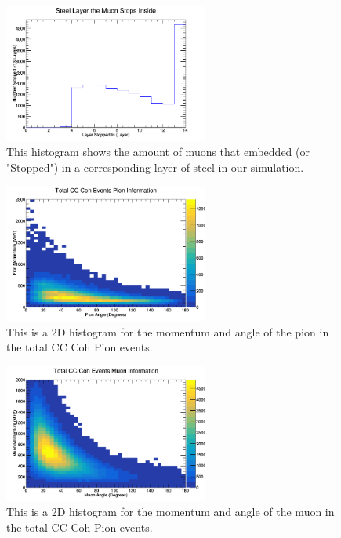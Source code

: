 \documentclass[11pt]{article}
\begin{document}
\begin{figure}[H]
\centering
\includegraphics[width=0.6\textwidth]{NewANMReinSehgalImages/7-LayerPenetrationANMRS.png}
\caption{This histogram shows the amount of muons that embedded (or "Stopped") in a corresponding layer of steel in our simulation.}
\end{figure}

\begin{figure}[H]
\centering
\includegraphics[width=0.6\textwidth]{NewANMReinSehgalImages/8-TotalCCCohPionInfoANMRS.png}
\caption{This is a 2D histogram for the momentum and angle of the pion in the total CC Coh Pion events.}
\end{figure}

\begin{figure}[H]
\centering
\includegraphics[width=0.6\textwidth]{NewANMReinSehgalImages/9-TotalCCCohMuonInfoANMRS.png}
\caption{This is a 2D histogram for the momentum and angle of the muon in the total CC Coh Pion events.}
\end{figure}
\end{document}
